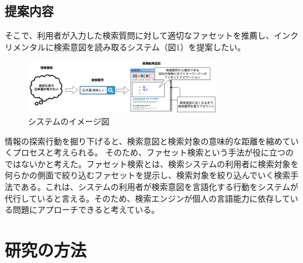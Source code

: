 \documentclass[a4j,10pt, twocolumn]{jarticle} \usepackage[dvipdfmx]{graphicx} \usepackage{amssymb} \usepackage{amsmath}
\begin{document}
\subsection{提案内容}

 そこで、利用者が入力した検索質問に対して適切なファセットを推薦し、インクリメンタルに検索意図を読み取るシステム（図1）を提案したい。

 \begin{figure}[h]
   \includegraphics[width=85mm]{./new_ir_with_navi.png}
   \caption{システムのイメージ図}
 \end{figure}
 
 情報の探索行動を掘り下げると、検索意図と検索対象の意味的な距離を縮めていくプロセスと考えられる。 そのため、ファセット検索という手法が役に立つのではないかと考えた。ファセット検索とは、検索システムの利用者に検索対象を何らかの側面で絞り込むファセットを提示し、検索対象を絞り込んでいく検索手法である\cite{faceted}。これは、システムの利用者が検索意図を言語化する行動をシステムが代行していると言える。そのため、検索エンジンが個人の言語能力に依存している問題にアプローチできると考えている。
\section{研究の方法}
\end{document}
